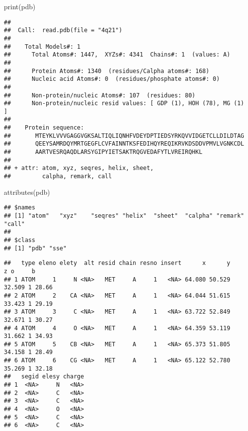 \documentclass[
]{article}
\newenvironment{Shaded}{\begin{snugshade}}{\end{snugshade}}
\newcommand{\FunctionTok}[1]{\textcolor[rgb]{0.00,0.00,0.00}{#1}}
\newcommand{\NormalTok}[1]{#1}
\newcommand{\SpecialCharTok}[1]{\textcolor[rgb]{0.00,0.00,0.00}{#1}}
\begin{document}
\begin{Shaded}
\begin{Highlighting}[]
\FunctionTok{print}\NormalTok{(pdb)}
\end{Highlighting}
\end{Shaded}

\begin{verbatim}
## 
##  Call:  read.pdb(file = "4q21")
## 
##    Total Models#: 1
##      Total Atoms#: 1447,  XYZs#: 4341  Chains#: 1  (values: A)
## 
##      Protein Atoms#: 1340  (residues/Calpha atoms#: 168)
##      Nucleic acid Atoms#: 0  (residues/phosphate atoms#: 0)
## 
##      Non-protein/nucleic Atoms#: 107  (residues: 80)
##      Non-protein/nucleic resid values: [ GDP (1), HOH (78), MG (1) ]
## 
##    Protein sequence:
##       MTEYKLVVVGAGGVGKSALTIQLIQNHFVDEYDPTIEDSYRKQVVIDGETCLLDILDTAG
##       QEEYSAMRDQYMRTGEGFLCVFAINNTKSFEDIHQYREQIKRVKDSDDVPMVLVGNKCDL
##       AARTVESRQAQDLARSYGIPYIETSAKTRQGVEDAFYTLVREIRQHKL
## 
## + attr: atom, xyz, seqres, helix, sheet,
##         calpha, remark, call
\end{verbatim}

\begin{Shaded}
\begin{Highlighting}[]
\FunctionTok{attributes}\NormalTok{(pdb)}
\end{Highlighting}
\end{Shaded}

\begin{verbatim}
## $names
## [1] "atom"   "xyz"    "seqres" "helix"  "sheet"  "calpha" "remark" "call"  
## 
## $class
## [1] "pdb" "sse"
\end{verbatim}

\begin{Shaded}
\end{Shaded}

\begin{verbatim}
##   type eleno elety  alt resid chain resno insert      x      y      z o     b
## 1 ATOM     1     N <NA>   MET     A     1   <NA> 64.080 50.529 32.509 1 28.66
## 2 ATOM     2    CA <NA>   MET     A     1   <NA> 64.044 51.615 33.423 1 29.19
## 3 ATOM     3     C <NA>   MET     A     1   <NA> 63.722 52.849 32.671 1 30.27
## 4 ATOM     4     O <NA>   MET     A     1   <NA> 64.359 53.119 31.662 1 34.93
## 5 ATOM     5    CB <NA>   MET     A     1   <NA> 65.373 51.805 34.158 1 28.49
## 6 ATOM     6    CG <NA>   MET     A     1   <NA> 65.122 52.780 35.269 1 32.18
##   segid elesy charge
## 1  <NA>     N   <NA>
## 2  <NA>     C   <NA>
## 3  <NA>     C   <NA>
## 4  <NA>     O   <NA>
## 5  <NA>     C   <NA>
## 6  <NA>     C   <NA>
\end{verbatim}
\end{document}
